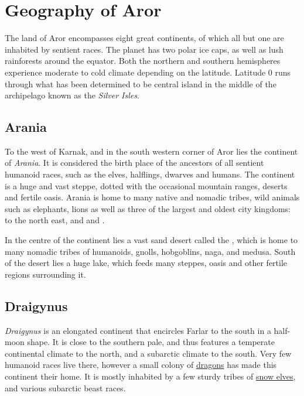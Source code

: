 \section{Geography of Aror}
\label{sec:Geography}

The land of Aror encompasses eight great continents, of which all but one are
inhabited by sentient races. The planet has two polar ice caps, as well as lush
rainforests around the equator. Both the northern and southern hemispheres
experience moderate to cold climate depending on the latitude. Latitude 0 runs
through what has been determined to be central island in the middle of the
archipelago known as the \emph{Silver Isles}.

\subsection{Arania}
\label{sec:Arania}

To the west of Karnak, and in the south western corner of Aror lies the
continent of \emph{Arania}. It is considered the birth place of the ancestors
of all sentient humanoid races, such as the elves, halflings, dwarves and
humans. The continent is a huge and vast steppe, dotted with the occasional
mountain ranges, deserts and fertile oasis. Arania is home to many native and
nomadic tribes, wild animals such as elephants, lions as well as three of the
largest and oldest city kingdoms:  to the north
east, and  and .

In the centre of the continent lies a vast sand desert called the
, which is home to many nomadic tribes of humanoids,
gnolls, hobgoblins, naga, and medusa. South of the desert lies a huge lake,
which feeds many steppes, oasis and other fertile regions surrounding it.

\subsection{Draigynus}
\label{sec:Draigynus}

\emph{Draigynus} is an elongated continent that encircles Farlar to the south
in a half-moon shape. It is close to the southern pale, and thus features a
temperate continental climate to the north, and a subarctic climate to the
south. Very few humanoid races live there, however a small colony of
\hyperref[sec:Dragons]{dragons} has made this continent their home. It is
mostly inhabited by a few sturdy tribes of \hyperref[sec:Snow Elves]{snow
  elves}, and various subarctic beast races.

